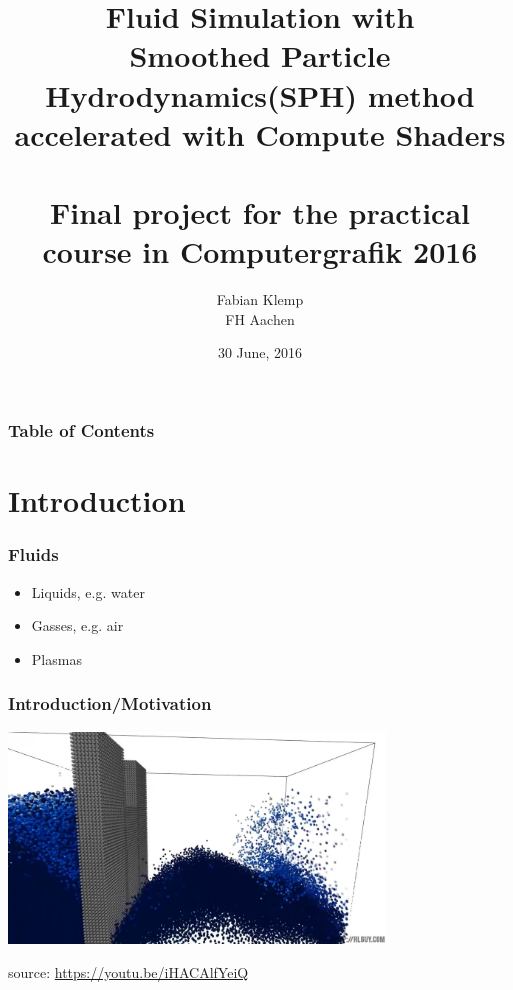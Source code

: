\documentclass{beamer}
\title{
    Fluid Simulation with\\
    Smoothed Particle Hydrodynamics(SPH) method\\
    accelerated with Compute Shaders\\
    ${\quad}$\\
    \small{Final project for the practical course in Computergrafik 2016}
}
\author{Fabian Klemp\\
    \small{FH Aachen}\\
}
\date{30 June, 2016}
\begin{document}
{
\begin{frame}[noframenumbering]
    \maketitle
\end{frame}
}
\begin{frame}
    \frametitle{Table of Contents}
    \tableofcontents
\end{frame}

\section{Introduction}
\begin{frame}
    \frametitle{Fluids}
    \begin{itemize}
        \item Liquids, e.g. water
        \item Gasses, e.g. air
        \item Plasmas
    \end{itemize}
\end{frame}
\begin{frame}
    \frametitle{Introduction/Motivation}
    \begin{center}
        \includegraphics[width=10cm]{introduction.jpg}
    \end{center}
    \begin{flushright}
        source: \href{https://youtu.be/iHACAlfYeiQ}{https://youtu.be/iHACAlfYeiQ}
    \end{flushright}
\end{frame}
\end{document}
